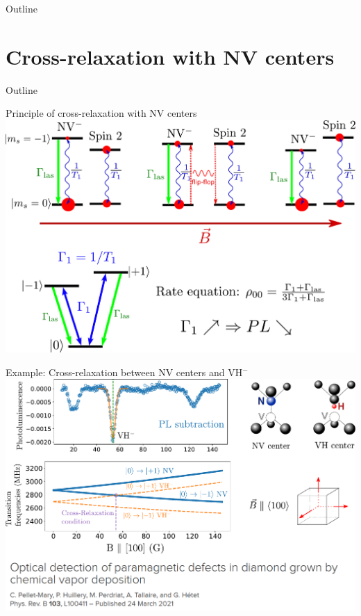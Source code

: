 \documentclass{beamer}
\begin{document}
\begin{frame}{Outline}
\tableofcontents
\end{frame}



\section{Cross-relaxation with NV centers}
\begin{frame}{Outline}
\tableofcontents[currentsection]
\end{frame}
\begin{frame}{Principle of cross-relaxation with NV centers}
\centering
\includegraphics[width=\textwidth,height=0.8\textheight,keepaspectratio]{Slide_CR_presentation}
\end{frame}

\begin{frame}{Example: Cross-relaxation between NV centers and VH$^-$}
\centering
\includegraphics[width=\textwidth,height=0.9\textheight,keepaspectratio]{Slide_CR_VH}
\end{frame}
\end{document}
